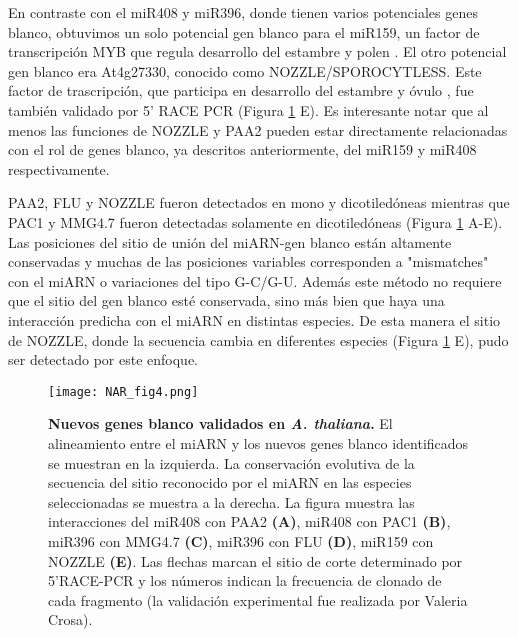En contraste con el miR408 y miR396, donde tienen varios potenciales genes blanco, obtuvimos un solo potencial gen blanco para el miR159, un factor de transcripción MYB que regula desarrollo del estambre y polen \citep{Millar2005}.
El otro potencial gen blanco era At4g27330, conocido como NOZZLE/SPOROCYTLESS.
Este factor de trascripción, que participa en desarrollo del estambre y óvulo \citep{Biology1999,Yang1999}, fue también validado por 5' RACE PCR (Figura \ref{fig:NAR_fig4} E).
Es interesante notar que al menos las funciones de NOZZLE y PAA2 pueden estar directamente relacionadas con el rol de genes blanco, ya descritos anteriormente, del miR159 y miR408 respectivamente.

PAA2, FLU y NOZZLE fueron detectados en mono y dicotiledóneas mientras que PAC1 y MMG4.7 fueron detectadas solamente en dicotiledóneas (Figura \ref{fig:NAR_fig4} A-E).
Las posiciones del sitio de unión del miARN-gen blanco están altamente conservadas y muchas de las posiciones variables corresponden a "mismatches" con el miARN o variaciones del tipo G-C/G-U.
Además este método no requiere que el sitio del gen blanco esté conservada, sino más bien que haya una interacción predicha con el miARN en distintas especies.
De esta manera el sitio de NOZZLE, donde la secuencia cambia en diferentes especies (Figura \ref{fig:NAR_fig4} E), pudo ser detectado por este enfoque.

\begin{figure}[htbp!] 
    \centering    
    \texttt{[image: NAR\_fig4.png]}
    \caption[Nuevos genes blanco validados en \textit{A. thaliana}.]{
    \textbf{Nuevos genes blanco validados en \textit{A. thaliana}.}
    El alineamiento entre el miARN y los nuevos genes blanco identificados se muestran en la izquierda.
    La conservación evolutiva de la secuencia del sitio reconocido por el miARN en las especies seleccionadas se muestra a la derecha. La figura muestra las interacciones del miR408 con PAA2
    \textbf{(A)}, miR408 con PAC1 \textbf{(B)}, miR396 con MMG4.7 \textbf{(C)}, miR396 con FLU \textbf{(D)}, miR159 con NOZZLE \textbf{(E)}.
    Las flechas marcan el sitio de corte determinado por 5’RACE-PCR y los números indican la frecuencia de clonado de cada fragmento (la validación experimental fue realizada por Valeria Crosa).}
    \label{fig:NAR_fig4}
\end{figure}


